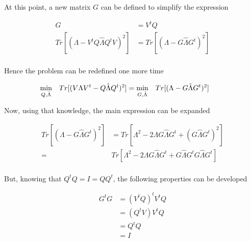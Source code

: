 \documentclass[12pt,journal]{IEEEtran}
\begin{document}
    At this point, a new matrix $G$ can be defined to simplify the expression

    \begin{equation*}
        \begin{aligned}
            G &= V^tQ\\
            Tr[(\Lambda - V^tQ \hat{\Lambda} Q^tV)^2] &= Tr[(\Lambda - G \hat{\Lambda} G^t)^2]\\
        \end{aligned}
    \end{equation*}

    Hence the problem can be redefined one more time

    \begin{equation*}
        \hspace{-0.5cm}
        \begin{aligned}
        \underset{Q,\hat{\Lambda}}{\text{min}} \quad Tr[(V\Lambda V^t - Q \hat{\Lambda} Q^t)^2]
        &=
        \underset{G,\hat{\Lambda}}{\text{min}} \quad Tr[(\Lambda - G \hat{\Lambda} G^t)^2]
        \end{aligned}
    \end{equation*}

    Now, using that knowledge, the main expression can be expanded

    \begin{equation*}
        \begin{aligned}
        Tr[(\Lambda - G \hat{\Lambda} G^t)^2]
        &=
        Tr[\Lambda^2 - 2 \Lambda G \hat{\Lambda} G^t + (G \hat{\Lambda} G^t)^2]\\
        =
        &Tr[\Lambda^2 - 2 \Lambda G \hat{\Lambda} G^t + G \hat{\Lambda} G^t G \hat{\Lambda} G^t]\\
        \end{aligned}
    \end{equation*}

    But, knowing that $Q^tQ = I = QQ^t$, the following properties can be developed

    \begin{equation*}
        \begin{aligned}
            G^tG &= (V^tQ)^t V^tQ\\
                 &= (Q^tV) V^tQ\\
                 &= Q^tQ\\
                 &= I
        \end{aligned}
    \end{equation*}
\end{document}
